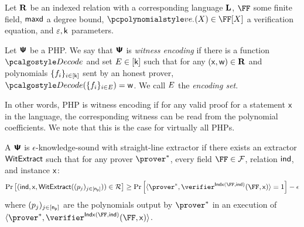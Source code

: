\documentclass[runningheads,11pt]{llncs}
\begin{document}
 \begin{definition}
  \label{def:php}
  Let $\mathbf{R}$ be an indexed relation with a corresponding language $\mathbf{L}$, $\FF$
  some finite field, $\mathsf{maxd}$ a degree bound, $\vereq_{\cdot}(X) \in \FF[X]$ a
  verification equation, and $\varepsilon, \mathsf{k}$ parameters.
\end{definition}

\begin{definition}
  \label{def:wephp}
  Let $\bm{\mathsf{\Psi}}$ be a PHP.  We say that $\bm{\mathsf{\Psi}}$ is \emph{witness encoding} if there is
  a function $\decode$ and set $E \in [\mathsf{k}]$ such that for any
  $(\mathsf{x}, \mathsf{w}) \in \mathbf{R}$ and polynomials $\{f_i\}_{i \in [\mathsf{k}]}$ sent by an
  honest prover, $\decode(\smallset{f_i}_{i \in \encset}) = \wit$. We call $E$ the
  \emph{encoding set}.
\end{definition}
In other words, PHP is witness encoding if for any valid proof for a statement
$\mathsf{x}$ in the language, the corresponding witness can be read from the
polynomial coefficients. We note that this is the case for virtually all
PHPs. 

\begin{definition}
\label{def:knownsound_wc_poly}
A $\bm{\mathsf{\Psi}}$ is $\epsilon$-knowledge-sound with straight-line extractor if there exists an
extractor $\mathsf{WitExtract}$ such that for any prover $\Pphp^*$, every field $\FF \in \Fam$,
relation ${\mathsf{ind}}$, and instance $\mathsf{x}$: 
\[ \Prob{ (\ind, \inp, \WitExtract(\tuple\pora{\nprv})) \in \relfam}
	\geq \Prob{ \braket{ \Pphp^*,\Vphp^{\Iphp(\FF,\ind)}(\FF,\inp) } = 1} - \epsilon
\]
where $(p_j)_{j \in [\mathsf{n_p}]}$ are the polynomials output by $\Pphp^*$ in an execution of
$\braket{\Pphp^*, \Vphp^{\Iphp(\FF,\ind)}(\FF,\inp)}$.
\end{definition}
\end{document}

